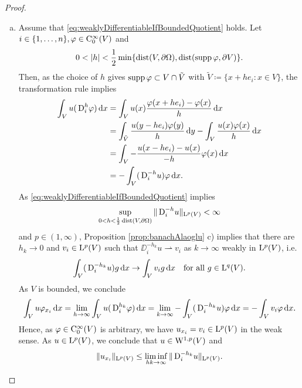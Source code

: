 \begin{proof}
\begin{enumerate}[a)]
    \item Assume that \eqref{eq:weaklyDifferentiableIfBoundedQuotient} holds.
      Let $i \in \{1,\dots,n\}, \varphi \in \mathrm{C}_0^\infty(V)$ and 
      $$
      0 < |h| < \frac{1}{2} \min\{ \operatorname{dist}(V,\partial\Omega), \operatorname{dist}(\operatorname{supp} \varphi, \partial V)\}.$$
      Then, as the choice of $h$ gives $\operatorname{supp} \varphi \subset V \cap \tilde V$ with $\tilde V \coloneqq \{ x + he_i \colon x \in V \}$, the transformation rule implies
      \begin{align*}
        \int_V u(\,{\operatorname{D}}_i^h \varphi)\, {\operatorname{d}\!{x}}
        &= \int_V u(x) \frac{\varphi(x + he_i) - \varphi(x)}{h} \, {\operatorname{d}\!{x}} \\
        &= \int_{\tilde V} \frac{u(y - h e_i)\varphi(y)}{h} \, {\operatorname{d}\!{y}} - \int_V \frac{u(x) \varphi(x)}{h} \, {\operatorname{d}\!{x}} \\
        &= \int_V - \frac{u(x - he_i) - u(x)}{-h} \varphi(x) \, {\operatorname{d}\!{x}} \\
        &= - \int_V (\,{\operatorname{D}}_i^{-h} u) \varphi \, {\operatorname{d}\!{x}}.
      \end{align*}
      As \eqref{eq:weaklyDifferentiableIfBoundedQuotient} implies
      $$
      \sup_{0 < h < \frac{1}{2} \operatorname{dist}(V, \partial\Omega)} \|\,{\operatorname{D}}_i^{-h} u\|_{\mathrm{L}^p(V)} < \infty
      $$
      and $p \in (1,\infty)$, Proposition \ref{prop:banachAlaoglu} c) implies that there are $h_k \to 0$ and $v_i \in \mathrm{L}^p(V)$ such that $\DD_i^{-h_k} u \rightharpoonup v_i$ as $k \to \infty$ weakly in $\mathrm{L}^p(V)$, i.e.
      \begin{equation}
        \label{eq:weakConvergenceInLp}
        \int_V (\,{\operatorname{D}}_i^{-h_k} u) g \, {\operatorname{d}\!{x}} \to \int_V v_i g \, {\operatorname{d}\!{x}} \quad\text{for all } g \in \mathrm{L}^q(V).
      \end{equation}
      As $V$ is bounded, we conclude
      $$
        \int_V u \varphi_{x_i} \, {\operatorname{d}\!{x}}
        = \lim_{h \to \infty} \int_V u( \,{\operatorname{D}}_i^{h_k} \varphi ) \, {\operatorname{d}\!{x}}
        = \lim_{k \to \infty} - \int_V ( \,{\operatorname{D}}_i^{-h_k} u) \varphi \, {\operatorname{d}\!{x}}
        = - \int_V v_i \varphi \, {\operatorname{d}\!{x}}.
      $$
      Hence, as $\varphi \in \mathrm{C}_0^\infty(V)$ is arbitrary, we have $u_{x_i} = v_i \in \mathrm{L}^p(V)$ in the weak sense.
      As $u \in \mathrm{L}^p(V)$, we conclude that $u \in \mathrm{W}^{1,p}(V)$ and
      \[
      \|u_{x_i}\|_{\mathrm{L}^p(V)} \leq \liminf_{h k \to \infty} \|\,{\operatorname{D}}_i^{-h_k} u \|_{\mathrm{L}^p(V)}. \qedhere
    \]
  \end{enumerate}
\end{proof}

